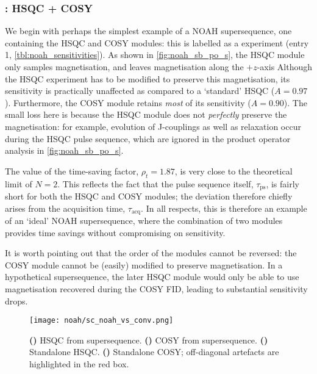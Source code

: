 \subsubsection{: HSQC + COSY}

We begin with perhaps the simplest example of a NOAH supersequence, one containing the HSQC and COSY modules: this is labelled as a  experiment (entry 1, \cref{tbl:noah_sensitivities}).
As shown in \cref{fig:noah_sb_po_s}, the HSQC module only samples  magnetisation, and leaves  magnetisation along the $+z$-axis
Although the HSQC experiment has to be modified to preserve this  magnetisation, its sensitivity is practically unaffected as compared to a `standard' HSQC ($A = 0.97$).
Furthermore, the COSY module retains \textit{most} of its sensitivity ($A = 0.90$).
The small loss here is because the HSQC module does not \textit{perfectly} preserve the  magnetisation: for example, evolution of J-couplings as well as relaxation occur during the HSQC pulse sequence, which are ignored in the product operator analysis in \cref{fig:noah_sb_po_s}.

The value of the time-saving factor, $\rho_t = 1.87$, is very close to the theoretical limit of $N = 2$.
This reflects the fact that the pulse sequence itself, $\tau_\text{ps}$, is fairly short for both the HSQC and COSY modules; the deviation therefore chiefly arises from the acquisition time, $\tau_\text{acq}$.
In all respects, this is therefore an example of an `ideal' NOAH supersequence, where the combination of two modules provides time savings without compromising on sensitivity.

It is worth pointing out that the order of the modules cannot be reversed: the COSY module cannot be (easily) modified to preserve  magnetisation.
In a hypothetical  supersequence, the later HSQC module would only be able to use magnetisation recovered during the COSY FID, leading to substantial sensitivity drops.

\begin{figure}[!ht]
    \centering
    \texttt{[image: noah/sc\_noah\_vs\_conv.png]}%
    {\label{fig:sc_noah_vs_conv_noah_s}}%
    {\label{fig:sc_noah_vs_conv_noah_c}}%
    {\label{fig:sc_noah_vs_conv_conv_s}}%
    {\label{fig:sc_noah_vs_conv_conv_c}}%
    \caption[Comparison of spectra obtained from  and standalone experiments]{
        \textbf{()} HSQC from  supersequence.
        \textbf{()} COSY from  supersequence.
        \textbf{()} Standalone HSQC.
        \textbf{()} Standalone COSY; off-diagonal artefacts are highlighted in the red box.
    }
    \label{fig:sc_noah_vs_conv}
\end{figure}

